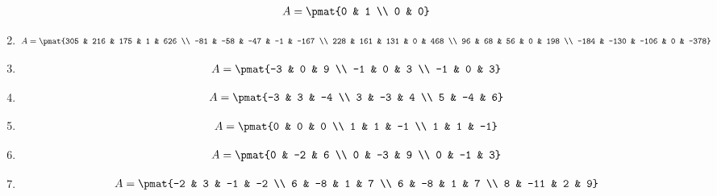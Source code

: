 \begin{enumerate}
\begin{align*}
A = \pmat{0 & 1 \\ 0 & 0}
\end{align*}

\item

\begin{align*}
A = \pmat{305 & 216 & 175 & 1 & 626 \\ -81 & -58 & -47 & -1 & -167 \\ 228 & 161 & 131 & 0 & 468 \\ 96 & 68 & 56 & 0 & 198 \\ -184 & -130 & -106 & 0 & -378}
\end{align*}

\item

\begin{align*}
A = \pmat{-3 & 0 & 9 \\ -1 & 0 & 3 \\ -1 & 0 & 3}
\end{align*}

\item

\begin{align*}
A = \pmat{-3 & 3 & -4 \\ 3 & -3 & 4 \\ 5 & -4 & 6}
\end{align*}

\item

\begin{align*}
A = \pmat{0 & 0 & 0 \\ 1 & 1 & -1 \\ 1 & 1 & -1}
\end{align*}

\item

\begin{align*}
A = \pmat{0 & -2 & 6 \\ 0 & -3 & 9 \\ 0 & -1 & 3}
\end{align*}

\item

\begin{align*}
A = \pmat{-2 & 3 & -1 & -2 \\ 6 & -8 & 1 & 7 \\ 6 & -8 & 1 & 7 \\ 8 & -11 & 2 & 9}
\end{align*}


\end{enumerate}
